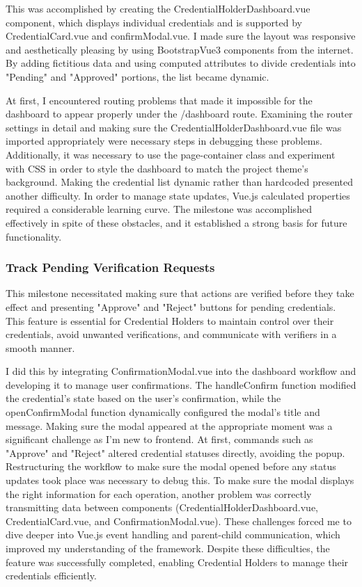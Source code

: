 This was accomplished by creating the CredentialHolderDashboard.vue component, which displays individual credentials and is supported by CredentialCard.vue and confirmModal.vue. I made sure the layout was responsive and aesthetically pleasing by using BootstrapVue3 components from the internet. By adding fictitious data and using computed attributes to divide credentials into "Pending" and "Approved" portions, the list became dynamic.

At first, I encountered routing problems that made it impossible for the dashboard to appear properly under the /dashboard route. Examining the router settings in detail and making sure the CredentialHolderDashboard.vue file was imported appropriately were necessary steps in debugging these problems. Additionally, it was necessary to use the page-container class and experiment with CSS in order to style the dashboard to match the project theme's background. Making the credential list dynamic rather than hardcoded presented another difficulty. In order to manage state updates, Vue.js calculated properties required a considerable learning curve. The milestone was accomplished effectively in spite of these obstacles, and it established a strong basis for future functionality.

\subsubsection{Track Pending Verification Requests}

This milestone necessitated making sure that actions are verified before they take effect and presenting "Approve" and "Reject" buttons for pending credentials. This feature is essential for Credential Holders to maintain control over their credentials, avoid unwanted verifications, and communicate with verifiers in a smooth manner.

I did this by integrating ConfirmationModal.vue into the dashboard workflow and developing it to manage user confirmations. The handleConfirm function modified the credential's state based on the user's confirmation, while the openConfirmModal function dynamically configured the modal's title and message. Making sure the modal appeared at the appropriate moment was a significant challenge as I'm new to frontend. At first, commands such as "Approve" and "Reject" altered credential statuses directly, avoiding the popup. Restructuring the workflow to make sure the modal opened before any status updates took place was necessary to debug this. To make sure the modal displays the right information for each operation, another problem was correctly transmitting data between components (CredentialHolderDashboard.vue, CredentialCard.vue, and ConfirmationModal.vue). These challenges forced me to dive deeper into Vue.js event handling and parent-child communication, which improved my understanding of the framework. Despite these difficulties, the feature was successfully completed, enabling Credential Holders to manage their credentials efficiently.

